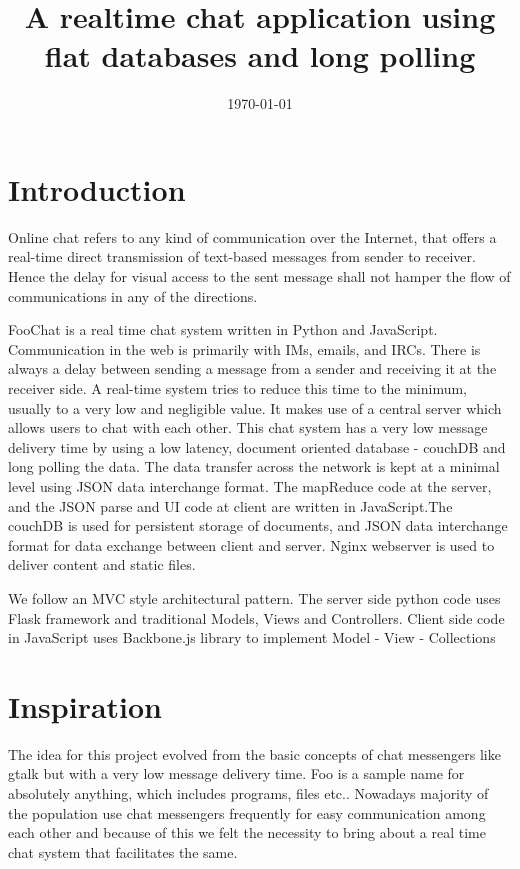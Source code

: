 \documentclass[a4paper,11pt,conference]{IEEEtran}
\title{A realtime chat application using flat databases and long polling}
\date{\today}
\author{
        \IEEEauthorblockN{Gayathri PP}
	\IEEEauthorblockA{B090412CS \\ pp.gayathri4u2@gmail.com }
\and
	\IEEEauthorblockN{Irene George}
	\IEEEauthorblockA{B090234CS \\ plasid\_91@yahoo.co.in}
\and 
	\IEEEauthorblockN{Jaseem Abid}
	\IEEEauthorblockA{B090264CS \\ jaseemabid@gmail.com}
\and 
	\IEEEauthorblockN{Jincy Abraham}
	\IEEEauthorblockA{B090238CS \\ jincy.a@gmail.com }
}
\begin{document}
	\maketitle
	\vspace{100px}

	\section{Introduction}

	Online chat refers to any kind of communication over the Internet, that offers a real-time direct transmission of text-based messages from sender to receiver. Hence the delay for visual access to the sent message shall not hamper the flow of communications in any of the directions.

	FooChat is a real time chat system written in Python and JavaScript. Communication in the web is primarily with IMs, emails, and IRCs. There is always a delay between sending a message from a sender and receiving it at the receiver side. A real-time system tries to reduce this time to the minimum, usually to a very low and negligible value. It makes use of a central server which allows users to chat with each other. This chat system has a very low message delivery time by using a low latency, document oriented database - couchDB and long polling the data. The data transfer across the network is kept at a minimal level using JSON data interchange format. The mapReduce code at the server, and the JSON parse and UI code at client are written in JavaScript.The couchDB is used for persistent storage of documents, and JSON data interchange format for data exchange between client and server. Nginx webserver is used to deliver content and static files.

	We follow an MVC style architectural pattern. The server side python code uses Flask framework and traditional Models, Views and Controllers. Client side code in JavaScript uses Backbone.js library to implement Model - View - Collections


	\section{Inspiration}
	The idea for this project evolved from the basic concepts of chat messengers like gtalk but with a very low message delivery time. Foo is a sample name for absolutely anything, which includes programs, files etc..  Nowadays majority of the population use chat messengers frequently for easy communication among each other and because of this we felt the necessity to bring about a real time chat system that 
facilitates the same.
\end{document}

